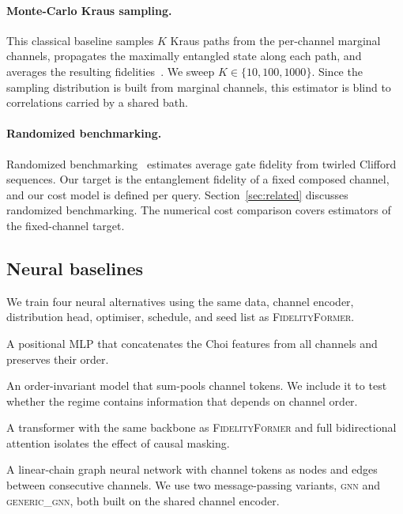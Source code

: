 \documentclass[12pt]{iopart}
\newcommand{\fidno}{\textsc{FidelityFormer}}
\begin{document}
\paragraph*{Monte-Carlo Kraus sampling.}
This classical baseline samples $K$ Kraus paths from the per-channel marginal channels, propagates the maximally entangled state along each path, and averages the resulting fidelities~\cite{wood_kraus_mc}. We sweep
$K \in \{10,100,1000\}$. Since the sampling distribution is built from marginal channels, this estimator is blind to correlations carried by a shared bath.

\paragraph*{Randomized benchmarking.}
Randomized benchmarking~\cite{rb_review} estimates average gate fidelity from twirled Clifford sequences. Our target is the entanglement fidelity of a fixed composed channel, and our cost model is defined per query. Section~\ref{sec:related} discusses randomized benchmarking. The numerical cost comparison covers estimators of the fixed-channel target.

\subsection{Neural baselines}

We train four neural alternatives using the same data, channel encoder, distribution head, optimiser, schedule, and seed list as \fidno{}.

\begin{description}[itemsep=2pt,topsep=2pt,leftmargin=*]
\item[MLP.]
A positional MLP that concatenates the Choi features from all channels and preserves their order.

\item[DeepSets~\cite{deepsets}.]
An order-invariant model that sum-pools channel tokens. We include it to test whether the regime contains information that depends on channel order.

\item[BiDir Transformer.]
A transformer with the same backbone as \fidno{} and full bidirectional attention isolates the effect of causal masking.

\item[GNN.]
A linear-chain graph neural network with channel tokens as nodes and edges between consecutive channels. We use two message-passing variants, \textsc{gnn} and \textsc{generic\_gnn}, both built on the shared channel encoder.
\end{description}
\end{document}
